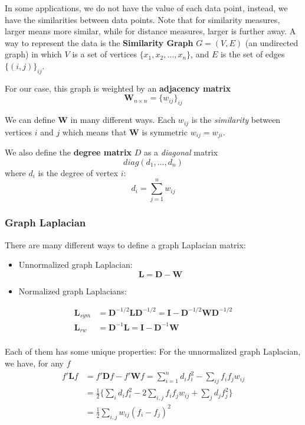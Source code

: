 \documentclass[
]{book}
\begin{document}
In some applications, we do not have the value of each data point, instead, we have the similarities between data points. Note that for similarity measures, larger means more similar, while for distance measures, larger is further away. A way to represent the data is the \textbf{Similarity Graph} \(G = (V,E)\) (an undirected graph) in which \(V\) is a set of vertices \(\{x_1, x_2, \ldots, x_n \}\), and \(E\) is the set of edges \(\{(i,j)\}_{ij}\).

For our case, this graph is weighted by an \textbf{adjacency matrix}
\[\mathbf{W}_{n \times n} = \{w_{ij}\}_{ij}\]

We can define \(\mathbf{W}\) in many different ways. Each \(w_{ij}\) is the \emph{similarity} between vertices \(i\) and \(j\) which means that \(\mathbf{W}\) is symmetric \(w_{ij} = w_{ji}\).

We also define the \textbf{degree matrix} \(D\) as a \emph{diagonal} matrix
\[diag(d_1, \ldots, d_n)\]
where \(d_i\) is the degree of vertex \(i\):
\[d_i = \sum_{j=1}^{n} w_{ij}\]

\subsubsection*{Graph Laplacian}\label{graph-laplacian}

There are many different ways to define a graph Laplacian matrix:

\begin{itemize}
\item
  Unnormalized graph Laplacian:
  \[\mathbf{L} = \mathbf{D} - \mathbf{W}\]
\item
  Normalized graph Laplacians:
\end{itemize}

\begin{align*}
\mathbf{L}_{sym} &= \mathbf{D}^{-1/2} \mathbf{L} \mathbf{D} ^{-1/2} = \mathbf{I} - \mathbf{D}^{-1/2} \mathbf{W} \mathbf{D}^{-1/2}\\
\mathbf{L}_{rw} &= \mathbf{D}^{-1} \mathbf{L} = \mathbf{I} - \mathbf{D}^{-1}\mathbf{W}\\
\end{align*}

Each of them has some unique properties:
For the unnormalized graph Laplacian, we have, for any \(f\)
\begin{align*}
f'\mathbf{L} f &= f'\mathbf{D} f - f'\mathbf{W} f = \sum_{i=1}^{n} d_i f_i^2 - \sum_{ij} f_i f_j w_{ij}\\
&= \frac{1}{2} \Biggl\{ \sum_{i} d_i f_i^2 - 2\sum_{i,j} f_i f_j w_{ij} + \sum_j d_j f_j^2 \Biggr\}\\
&= \frac{1}{2} \sum_{i,j} w_{ij} (f_i - f_j)^2
\end{align*}
\end{document}
